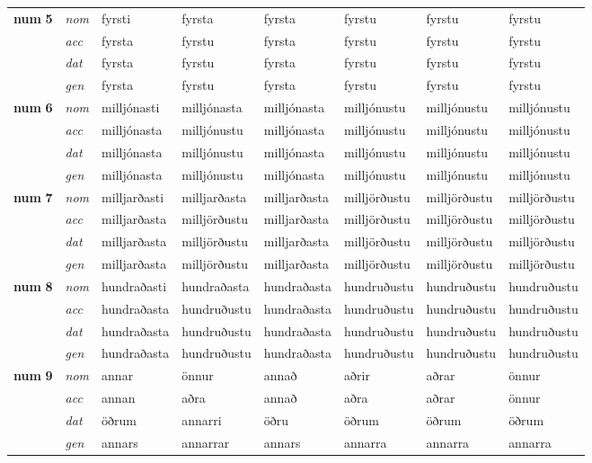 \begin{longtable}[l]{l>{\footnotesize\itshape}lXXXXXX}
\multirow{3}{*}{{{\textbf{num} \Large{\textbf{5}}}}}  &  nom & fyrsti & fyrsta    & fyrsta & fyrstu & fyrstu & fyrstu \\*
  & acc &  fyrsta  & fyrstu   & fyrsta & fyrstu & fyrstu & fyrstu \\*
&  dat & fyrsta & fyrstu   & fyrsta & fyrstu & fyrstu & fyrstu \\*
  & gen & fyrsta  & fyrstu  & fyrsta & fyrstu & fyrstu & fyrstu\\
\cmidrule{1-8}

\multirow{3}{*}{{{\textbf{num} \Large{\textbf{6}}}}}  &  nom & milljónasti & milljónasta    & milljónasta & milljónustu & milljónustu & milljónustu \\*
  & acc &  milljónasta  & milljónustu   & milljónasta & milljónustu & milljónustu & milljónustu \\*
&  dat & milljónasta & milljónustu   & milljónasta & milljónustu & milljónustu & milljónustu \\*
  & gen & milljónasta  & milljónustu  & milljónasta & milljónustu & milljónustu & milljónustu\\
\cmidrule{1-8}

\multirow{3}{*}{{{\textbf{num} \Large{\textbf{7}}}}}  &  nom & milljarðasti & milljarðasta    & milljarðasta & milljörðustu & milljörðustu & milljörðustu \\*
  & acc &  milljarðasta  & milljörðustu   & milljarðasta & milljörðustu & milljörðustu & milljörðustu \\*
&  dat & milljarðasta & milljörðustu   & milljarðasta & milljörðustu & milljörðustu & milljörðustu \\*
  & gen & milljarðasta  & milljörðustu  & milljarðasta & milljörðustu & milljörðustu & milljörðustu\\
\cmidrule{1-8}

\multirow{3}{*}{{{\textbf{num} \Large{\textbf{8}}}}}  &  nom & hundraðasti & hundraðasta    & hundraðasta & hundruðustu & hundruðustu & hundruðustu \\*
  & acc &  hundraðasta  & hundruðustu   & hundraðasta & hundruðustu & hundruðustu & hundruðustu \\*
&  dat & hundraðasta & hundruðustu   & hundraðasta & hundruðustu & hundruðustu & hundruðustu \\*
  & gen & hundraðasta  & hundruðustu  & hundraðasta & hundruðustu & hundruðustu & hundruðustu\\
\cmidrule{1-8}

\multirow{3}{*}{{{\textbf{num} \Large{\textbf{9}}}}}  &  nom & annar & önnur    & annað & aðrir & aðrar & önnur \\*
  & acc &  annan  & aðra   & annað & aðra & aðrar & önnur \\*
&  dat & öðrum & annarri   & öðru & öðrum & öðrum & öðrum \\*
  & gen & annars  & annarrar  & annars & annarra & annarra & annarra\\

\end{longtable}
